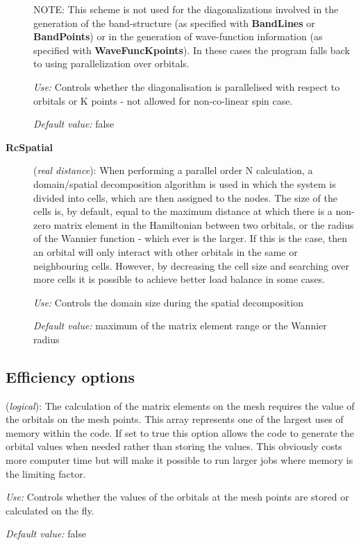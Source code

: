 \documentclass[11pt]{article}
\begin{document}
\begin{description}
NOTE: This scheme is not used for the diagonalizations involved in the
generation of the band-structure (as specified with {\bf BandLines} or
{\bf BandPoints}) or in the generation of wave-function information
(as specified with {\bf WaveFuncKpoints}). In these cases the program
falls back to using parallelization over orbitals.

{\it Use:} Controls whether the diagonalisation is parallelised with
respect to orbitals or K points - not allowed for non-co-linear spin
case.

{\it Default value:}  false

\item[{\bf RcSpatial}] ({\it real distance}):
When performing a parallel order N calculation, a domain/spatial
decomposition algorithm is used in which the system is divided into
cells, which are then assigned to the nodes. The size of the cells
is, by default, equal to the maximum distance at which there is a non-zero
matrix element in the Hamiltonian between two orbitals, or the
radius of the Wannier function - which ever is the larger. If this is
the case, then an orbital will only interact with other orbitals in the same
or neighbouring cells. However, by decreasing the cell size and searching
over more cells it is possible to achieve better load balance in some
cases.

{\it Use:} Controls the domain size during the spatial decomposition

{\it Default value:}  maximum of the matrix element range or the Wannier radius

\end{description}


\vspace{5pt}
\subsection{Efficiency options}

\begin{description}
\itemsep 10pt
\parsep 0pt

\item[{\bf DirectPhi}] ({\it logical}):
The calculation of the matrix elements on the mesh requires the
value of the orbitals on the mesh points. This array represents one of
the largest uses of memory within the code. If set to true this option
allows the code to generate the orbital values when needed rather than
storing the values. This obviously costs more computer time but will
make it possible to run larger jobs where memory is the limiting factor.

{\it Use:} Controls whether the values of the orbitals at the mesh points
  are stored or calculated on the fly.

{\it Default value:}  false

\end{description}
\end{document}
